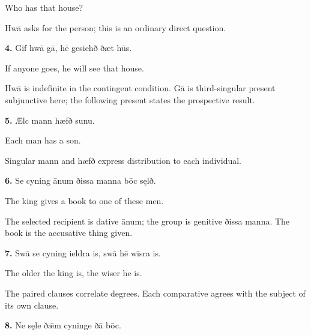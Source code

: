 Who has that house?

Hwā asks for the person; this is an ordinary direct question.

\textbf{4.} Gif hwā gā, hē gesiehð ðæt hūs.

If anyone goes, he will see that house.

Hwā is indefinite in the contingent condition. Gā is third-singular present subjunctive here; the following present states the prospective result.

\textbf{5.} Ǣlc mann hæfð sunu.

Each man has a son.

Singular mann and hæfð express distribution to each individual.

\textbf{6.} Se cyning ānum ðissa manna bōc sęlð.

The king gives a book to one of these men.

The selected recipient is dative ānum; the group is genitive ðissa manna. The book is the accusative thing given.

\textbf{7.} Swā se cyning ieldra is, swā hē wīsra is.

The older the king is, the wiser he is.

The paired clauses correlate degrees. Each comparative agrees with the subject of its own clause.

\textbf{8.} Ne sęle ðǣm cyninge ðā bōc.

